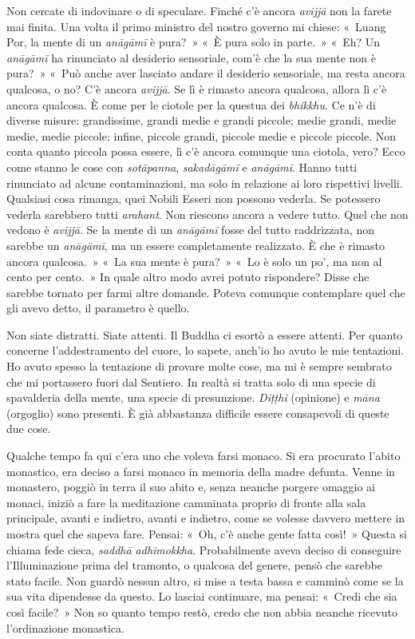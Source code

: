 Non cercate di indovinare o di speculare. Finché c'è ancora
\emph{avijjā} non la farete mai finita. Una volta il
primo ministro del nostro governo mi chiese: «~Luang Por, la mente di un
\emph{anāgāmī} è pura?~» «~È pura
solo in parte.~» «~Eh? Un \emph{anāgāmī} ha rinunciato al desiderio
sensoriale, com'è che la sua mente non è pura?~» «~Può anche aver
lasciato andare il desiderio sensoriale, ma resta ancora qualcosa, o no?
C'è ancora \emph{avijjā}. Se lì è rimasto ancora qualcosa, allora lì c'è
ancora qualcosa. È come per le ciotole per la questua dei
\emph{bhikkhu}. Ce n'è di diverse misure: grandissime, grandi medie e
grandi piccole; medie grandi, medie medie, medie piccole; infine,
piccole grandi, piccole medie e piccole piccole. Non conta quanto
piccola possa essere, lì c'è ancora comunque una ciotola, vero? Ecco
come stanno le cose con \emph{sotāpanna}, \emph{sakadāgāmī} e
\emph{anāgāmī}. Hanno tutti rinunciato ad alcune contaminazioni, ma solo
in relazione ai loro rispettivi livelli. Qualsiasi cosa rimanga, quei
Nobili Esseri non possono vederla. Se potessero vederla sarebbero tutti
\emph{arahant}. Non riescono ancora a vedere tutto. Quel
che non vedono è \emph{avijjā}. Se la mente di un \emph{anāgāmī} fosse
del tutto raddrizzata, non sarebbe un \emph{anāgāmī}, ma un essere
completamente realizzato. È che è rimasto ancora qualcosa.~» «~La sua
mente è pura?~» «~Lo è solo un po', ma non al cento per cento.~» In
quale altro modo avrei potuto rispondere? Disse che sarebbe tornato per
farmi altre domande. Poteva comunque contemplare quel che gli avevo
detto, il parametro è quello.

Non siate distratti. Siate attenti. Il Buddha ci esortò a essere
attenti. Per quanto concerne l'addestramento del cuore, lo sapete,
anch'io ho avuto le mie tentazioni. Ho avuto spesso la tentazione di
provare molte cose, ma mi è sempre sembrato che mi portassero fuori dal
Sentiero. In realtà si tratta solo di una specie di spavalderia della
mente, una specie di presunzione. \emph{Diṭṭhi} (opinione) e \emph{māna}
(orgoglio) sono presenti. È già abbastanza difficile essere consapevoli
di queste due cose.

Qualche tempo fa qui c'era uno che voleva farsi monaco. Si era procurato
l'abito monastico, era deciso a farsi monaco in memoria della madre
defunta. Venne in monastero, poggiò in terra il suo abito e, senza
neanche porgere omaggio ai monaci, iniziò a fare la meditazione
camminata proprio di fronte alla sala principale, avanti e indietro,
avanti e indietro, come se volesse davvero mettere in mostra quel che
sapeva fare. Pensai: «~Oh, c'è anche gente fatta così!~» Questa si
chiama fede cieca, \emph{saddhā adhimokkha}. Probabilmente aveva deciso
di conseguire l'Illuminazione prima del tramonto, o qualcosa del genere,
pensò che sarebbe stato facile. Non guardò nessun altro, si mise a testa
bassa e camminò come se la sua vita dipendesse da questo. Lo lasciai
continuare, ma pensai: «~Credi che sia così facile?~» Non so quanto
tempo restò, credo che non abbia neanche ricevuto l'ordinazione
monastica.

